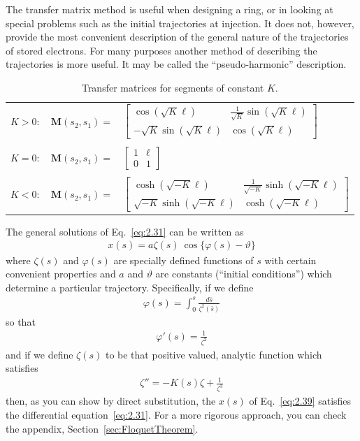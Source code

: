 \documentclass[../sands-adaptation.tex]{subfiles}
\begin{document}
The transfer matrix method is useful when designing a ring, or in looking at special problems such as the initial trajectories at injection. It does not, however, provide the most convenient description of the general nature of the trajectories of stored electrons. For many purposes another method of describing the trajectories is more useful. It may be called the ``pseudo-harmonic'' description.
\begin{table}[!ht]
	\caption{Transfer matrices for segments of constant $K$.}
	\centering
	\begin{tabular}{lrl}
		$K>0:$ & $\boldsymbol{M}(s_2,s_1) =$ &  $\begin{bmatrix}
			\cos(\sqrt{K}\ell) & \frac{1}{\sqrt{K}}\sin(\sqrt{K}\ell)\\
			-\sqrt{K}\sin(\sqrt{K}\ell) & \cos(\sqrt{K}\ell)
			\end{bmatrix}$\\
		\\
		$K=0$: & $\boldsymbol{M}(s_2,s_1) =$ & $\begin{bmatrix}
			1 & \ell\\
			0 & 1
			\end{bmatrix}$\\
		\\
		$K<0:$ & $\boldsymbol{M}(s_2,s_1) =$ & $\begin{bmatrix}
				\cosh(\sqrt{-K}\ell) & \frac{1}{\sqrt{-K}}\sinh(\sqrt{-K}\ell)\\
				\sqrt{-K}\sinh(\sqrt{-K}\ell) & \cosh(\sqrt{-K}\ell)
				\end{bmatrix}$
	\end{tabular}
	\label{tab:tab1}
\end{table}

The general solutions of Eq.~\eqref{eq:2.31} can be written as
\begin{align}
	x(s) = a\zeta(s)\ \cos\{\varphi(s)-\vartheta\}\label{eq:2.39}
\end{align}
where $\zeta(s)$ and $\varphi(s)$ are specially defined functions of $s$ with certain convenient properties and $a$ and $\vartheta$ are constants (``initial conditions'') which determine a particular trajectory. Specifically, if we define
\begin{align}
	\varphi(s) = \int_{0}^{s} \frac{d\bar{s}}{\zeta^2(\bar{s})}
\end{align}
so that
\begin{align}
	\varphi'(s) = \frac{1}{\zeta^2}
\end{align}
and if we define $\zeta(s)$ to be that positive valued, analytic function which satisfies
\begin{align}
	\zeta'' = -K(s)\zeta+\frac{1}{\zeta^3}\label{eq:2.42}
\end{align}
then, as you can show by direct substitution, the $x(s)$ of Eq.~\eqref{eq:2.39} satisfies the differential equation~\eqref{eq:2.31}. For a more rigorous approach, you can check the appendix, Section~\ref{sec:FloquetTheorem}.
\end{document}
